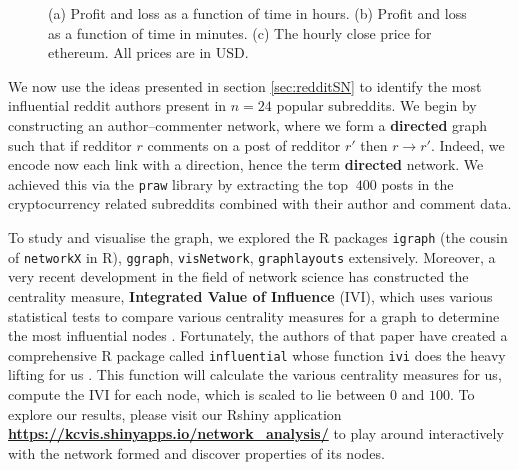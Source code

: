 \documentclass[twoside]{report}
\newcommand{\code}{\texttt}
\begin{document}
\begin{spacing}{1}
\begin{figure}[h]
\caption{(a) Profit and loss as a function of time in hours. (b) Profit and loss as a function of time in minutes. (c) The hourly close price for ethereum. All prices are in USD.}
\label{fig:pnl_naji102}
\end{figure}
We now use the ideas presented in section \ref{sec:redditSN} to identify the most influential reddit authors present in $n=24$ popular subreddits. We begin by constructing an author--commenter network, where we form a \textbf{directed} graph such that if redditor $r$ comments on a post of redditor $r'$ then $r \rightarrow r'$. Indeed, we encode now each link with a direction, hence the term \textbf{directed} network. We achieved this via the \code{praw} library by extracting the top $~400$ posts in the cryptocurrency related subreddits combined with their author and comment data. 



To study and visualise the graph, we explored the R packages \code{igraph} (the cousin of \code{networkX} in R), \code{ggraph}, \code{visNetwork}, \code{graphlayouts} extensively. Moreover, a very recent development in the field of network science has constructed the centrality measure, \textbf{Integrated Value of Influence} (IVI), which uses various statistical tests to compare various centrality measures for a graph to determine the most influential nodes \cite{IVIpatterns}. Fortunately, the authors of that paper have created a comprehensive R package called \code{influential} whose function \code{ivi} does the heavy lifting for us \cite{IVIvignette}. This function will calculate the various centrality measures for us, compute the IVI for each node, which is scaled to lie between $0$ and $100$. To explore our results, please visit our Rshiny application \textbf{\url{https://kcvis.shinyapps.io/network_analysis/}} to play around interactively with the network formed and discover properties of its nodes. 




\end{spacing}
\end{document}
